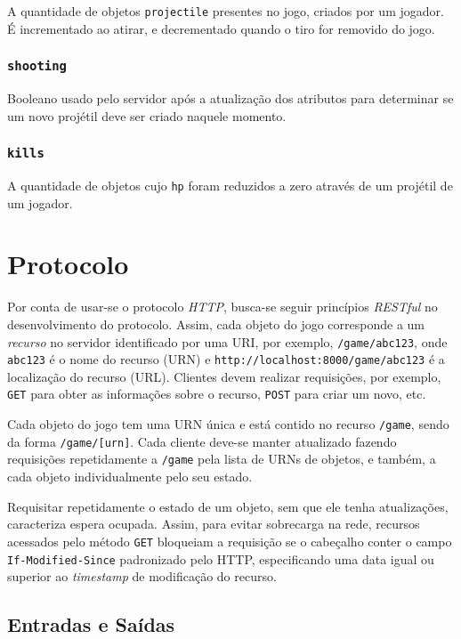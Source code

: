 \documentclass[12pt,a4paper]{article}
\begin{document}
A quantidade de objetos \texttt{projectile} presentes no jogo, criados por um
jogador. É incrementado ao atirar, e decrementado quando o tiro for removido do
jogo.

\subsubsection{\texttt{shooting}}

Booleano usado pelo servidor após a atualização dos atributos para determinar
se um novo projétil deve ser criado naquele momento.

\subsubsection{\texttt{kills}}

A quantidade de objetos cujo \texttt{hp} foram reduzidos a zero através de um
projétil de um jogador.

\pagebreak \section{Protocolo}

Por conta de usar-se o protocolo \textit{HTTP}, busca-se seguir princípios
\textit{RESTful} no desenvolvimento do protocolo. Assim, cada objeto do jogo
corresponde a um \textit{recurso} no servidor identificado por uma URI, por
exemplo, \texttt{/game/abc123}, onde \texttt{abc123} é o nome do recurso (URN)
e \texttt{http://localhost:8000/game/abc123} é a localização do recurso (URL).
Clientes devem realizar requisições, por exemplo, \texttt{GET} para obter as
informações sobre o recurso, \texttt{POST} para criar um novo, etc.

Cada objeto do jogo tem uma URN única e está contido no recurso \texttt{/game},
sendo da forma \texttt{/game/[urn]}. Cada cliente deve-se manter atualizado
fazendo requisições repetidamente a \texttt{/game} pela lista de URNs de
objetos, e também, a cada objeto individualmente pelo seu estado.

Requisitar repetidamente o estado de um objeto, sem que ele tenha atualizações,
caracteriza espera ocupada. Assim, para evitar sobrecarga na rede, recursos
acessados pelo método \texttt{GET} bloqueiam a requisição se o cabeçalho conter
o campo \texttt{If-Modified-Since} padronizado pelo HTTP, especificando uma
data igual ou superior ao \textit{timestamp} de modificação do recurso.

\subsection{Entradas e Saídas}
\end{document}
